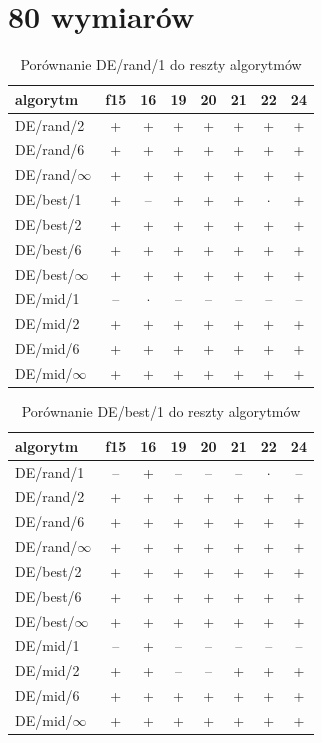 \documentclass[a4paper,onecolumn,oneside,11pt,wide,floatssmall]{mwrep}
\theoremstyle{definition}
\theoremstyle{plain}%
\theoremstyle{remark}
\begin{document}
\section{80 wymiarów}

\begin{table}[H]
\centering
\begin{tabular}{ l | c | c | c | c | c | c | c }
algorytm         &f15& 16& 19& 20& 21& 22& 24 \\ \hline
DE/rand/2	 & + & + & + & + & + & + & + \\
DE/rand/6	 & + & + & + & + & + & + & + \\
DE/rand/$\infty$	 & + & + & + & + & + & + & + \\
DE/best/1	 & + & -- & + & + & + & $\cdot$ & + \\
DE/best/2	 & + & + & + & + & + & + & + \\
DE/best/6	 & + & + & + & + & + & + & + \\
DE/best/$\infty$	 & + & + & + & + & + & + & + \\
DE/mid/1	 & -- & $\cdot$ & -- & -- & -- & -- & -- \\
DE/mid/2	 & + & + & + & + & + & + & + \\
DE/mid/6	 & + & + & + & + & + & + & + \\
DE/mid/$\infty$	 & + & + & + & + & + & + & + \\
\end{tabular}
\caption{Porównanie DE/rand/1 do reszty algorytmów}
\end{table}

\begin{table}[H]
\centering
\begin{tabular}{ l | c | c | c | c | c | c | c }
algorytm         &f15& 16& 19& 20& 21& 22& 24 \\ \hline
DE/rand/1	 & -- & + & -- & -- & -- & $\cdot$ & -- \\
DE/rand/2	 & + & + & + & + & + & + & + \\
DE/rand/6	 & + & + & + & + & + & + & + \\
DE/rand/$\infty$	 & + & + & + & + & + & + & + \\
DE/best/2	 & + & + & + & + & + & + & + \\
DE/best/6	 & + & + & + & + & + & + & + \\
DE/best/$\infty$	 & + & + & + & + & + & + & + \\
DE/mid/1	 & -- & + & -- & -- & -- & -- & -- \\
DE/mid/2	 & + & + & -- & -- & + & + & + \\
DE/mid/6	 & + & + & + & + & + & + & + \\
DE/mid/$\infty$	 & + & + & + & + & + & + & + \\

\end{tabular}
\caption{Porównanie DE/best/1 do reszty algorytmów}
\end{table}
\end{document}
